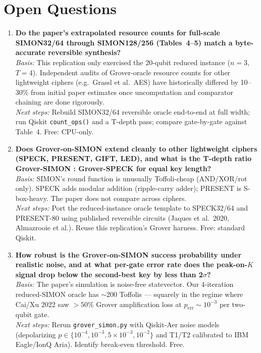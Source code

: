 \section{Open Questions}

\begin{enumerate}

\item \textbf{Do the paper's extrapolated resource counts for full-scale
SIMON32/64 through SIMON128/256 (Tables~4--5) match a byte-accurate reversible
synthesis?} \\
\emph{Basis:} This replication only exercised the 20-qubit reduced instance
($n{=}3$, $T{=}4$). Independent audits of Grover-oracle resource counts for
other lightweight ciphers (e.g.\ Grassl et al.\ AES) have historically differed
by 10--30\% from initial paper estimates once uncomputation and comparator
chaining are done rigorously. \\
\emph{Next steps:} Rebuild SIMON32/64 reversible oracle end-to-end at full
width; run Qiskit \texttt{count\_ops()} and a T-depth pass; compare gate-by-gate
against Table~4. Free: CPU-only.

\item \textbf{Does Grover-on-SIMON extend cleanly to other lightweight ciphers
(SPECK, PRESENT, GIFT, LED), and what is the T-depth ratio Grover-SIMON :
Grover-SPECK for equal key length?} \\
\emph{Basis:} SIMON's round function is unusually Toffoli-cheap (AND/XOR/rot
only). SPECK adds modular addition (ripple-carry adder); PRESENT is
S-box-heavy. The paper does not compare across ciphers. \\
\emph{Next steps:} Port the reduced-instance oracle template to SPECK32/64 and
PRESENT-80 using published reversible circuits (Jaques et al.\ 2020, Almazrooie
et al.). Reuse this replication's Grover harness. Free: standard Qiskit.

\item \textbf{How robust is the Grover-on-SIMON success probability under
realistic noise, and at what per-gate error rate does the peak-on-$K$ signal
drop below the second-best key by less than 2$\sigma$?} \\
\emph{Basis:} The paper's simulation is noise-free statevector. Our 4-iteration
reduced-SIMON oracle has $\sim$200 Toffolis --- squarely in the regime where
Cai/Xu 2022 saw $>50\%$ Grover amplification loss at $p_{\mathrm{err}} \sim 10^{-3}$
per two-qubit gate. \\
\emph{Next steps:} Rerun \texttt{grover\_simon.py} with Qiskit-Aer noise
models (depolarizing $p \in \{10^{-4}, 10^{-3}, 5{\times}10^{-3}, 10^{-2}\}$
and T1/T2 calibrated to IBM Eagle/IonQ Aria). Identify break-even threshold.
Free.


\end{enumerate}
